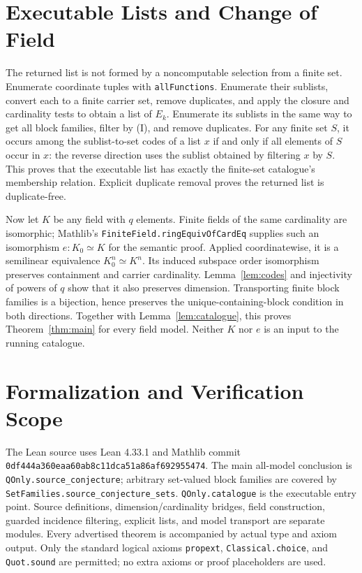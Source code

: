 \documentclass[11pt]{article}
\begin{document}
\section{Executable Lists and Change of Field}
The returned list is not formed by a noncomputable selection from a
finite set. Enumerate coordinate tuples with \texttt{allFunctions}.
Enumerate their sublists, convert each to a finite carrier set, remove
duplicates, and apply the closure and cardinality tests to obtain a
list of $E_k$. Enumerate its sublists in the same way to get all
block families, filter by \textup{(I)}, and remove duplicates.
For any finite set $S$, it occurs among the sublist-to-set codes of
a list $x$ if and only if all elements of $S$ occur in $x$: the
reverse direction uses the sublist obtained by filtering $x$ by $S$.
This proves that the executable list has exactly the finite-set
catalogue's membership relation. Explicit duplicate removal proves
the returned list is duplicate-free.

Now let $K$ be any field with $q$ elements. Finite fields of the same
cardinality are isomorphic; Mathlib's
\texttt{FiniteField.ringEquivOfCardEq} supplies such an isomorphism
$e:K_0\simeq K$ for the semantic proof. Applied coordinatewise, it is
a semilinear equivalence $K_0^n\simeq K^n$. Its induced subspace
order isomorphism preserves containment and carrier cardinality.
Lemma~\ref{lem:codes} and injectivity of powers of $q$ show that it
also preserves dimension. Transporting finite block families is a
bijection, hence preserves the unique-containing-block condition in
both directions. Together with Lemma~\ref{lem:catalogue}, this proves
Theorem~\ref{thm:main} for every field model. Neither $K$ nor $e$ is
an input to the running catalogue.

\section{Formalization and Verification Scope}
The Lean source uses Lean 4.33.1 and Mathlib commit
\texttt{0df444a360eaa60ab8c11dca51a86af692955474}.
The main all-model conclusion is
\texttt{QOnly.source\_conjecture}; arbitrary set-valued block families
are covered by \texttt{SetFamilies.source\_conjecture\_sets}.
\texttt{QOnly.catalogue} is the executable entry point. Source
definitions, dimension/cardinality bridges, field construction,
guarded incidence filtering, explicit lists, and model transport are
separate modules. Every advertised theorem is accompanied by actual
type and axiom output. Only the standard logical axioms
\texttt{propext}, \texttt{Classical.choice}, and \texttt{Quot.sound}
are permitted; no extra axioms or proof placeholders are used.
\end{document}
